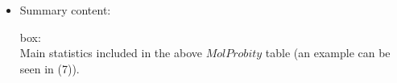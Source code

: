 \begin{itemize}
 \item Summary content:
 
   box:\\Main statistics included in the above $MolProbity$  table (an example can be seen in  (7)).

\end{itemize}
